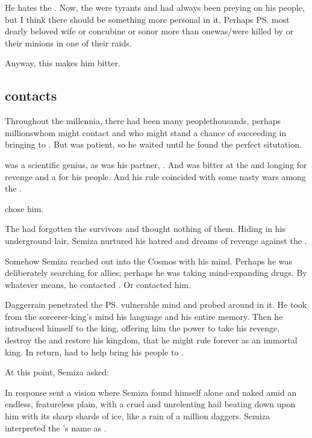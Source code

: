 He hates the \dragons{}. 
Now, the \dragons{} were tyrants and had always been preying on his people, but I think there should be something more personal in it. 
Perhaps \ps{\Semiza}{} most dearly beloved wife or concubine or son\dash or more than one\dash was/were killed by \dragons{} or their minions in one of their raids. 

Anyway, this makes him bitter.









\subsection{\Daggerrain{} contacts \Semiza}
Throughout the millennia, there had been many people\dash thousands, perhaps millions\dash whom \Daggerrain{} might contact and who might stand a chance of succeeding in bringing \banes{} to \Miith. 
But \Daggerrain{} was patient, so he waited until he found the perfect situtation. 

\Semiza{} was a scientific genius, as was his partner, \Eshayzal. 
And \Semiza{} was bitter at the \dragons{} and longing for revenge and a  for his people. 
And his rule coincided with some nasty wars among the \dragons. 

\Daggerrain{} chose him. 

The \dragons{} had forgotten the \nephil{} survivors and thought nothing of them. 
Hiding in his underground lair, Semiza nurtured his hatred and dreams of revenge against the \dragons{}. 

Somehow Semiza reached out into the Cosmos with his mind. 
Perhaps he was deliberately searching for allies; perhaps he was taking mind-expanding drugs. 
By whatever means, he contacted \Daggerrain. 
Or \Daggerrain{} contacted him. 

Daggerrain penetrated the \ps{\nephil} vulnerable mind and probed around in it. 
He took from the sorcerer-king's mind his language and his entire memory. 
Then he introduced himself to the \nephil{} king, offering him the power to take his revenge, destroy the \dragons{} and restore his kingdom, that he might rule forever as an immortal king. 
In return, \Semiza{} had to help \Daggerrain{} bring his people to \Miith{}. 

At this point, Semiza asked: 

In response \Daggerrain{} sent a vision where Semiza found himself alone and naked amid an endless, featureless plain, with a cruel and unrelenting hail beating down upon him with its sharp shards of ice, like a rain of a million daggers. 
Semiza interpreted the \banelord{}'s name as . 

